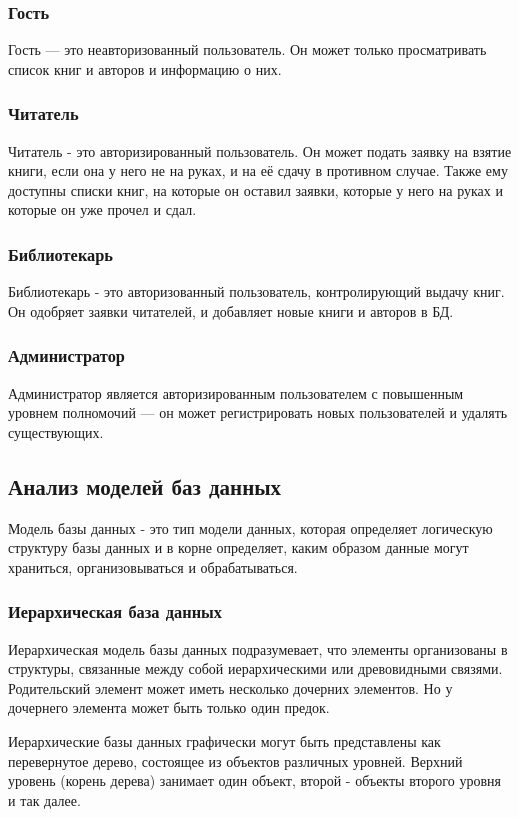 \subsubsection{Гость}
Гость — это неавторизованный пользователь. Он может только просматривать список книг и авторов и информацию о них.
\subsubsection{Читатель}
Читатель - это авторизированный пользователь. Он может подать заявку на взятие книги, если она у него не на руках, и на её сдачу в противном случае. Также ему доступны списки книг, на которые он оставил заявки, которые у него на руках и которые он уже прочел и сдал.
\subsubsection{Библиотекарь} 
Библиотекарь - это авторизованный пользователь, контролирующий выдачу книг. Он одобряет заявки читателей, и добавляет новые книги и авторов в БД.
\subsubsection{Администратор}
Администратор является авторизированным пользователем с повышенным уровнем полномочий — он может регистрировать новых пользователей и удалять существующих.
\subsection{Анализ моделей баз данных}
Модель базы данных - это тип модели данных, которая определяет логическую структуру базы данных и в корне определяет, каким образом данные могут храниться, организовываться и обрабатываться.

\subsubsection{Иерархическая база данных}
Иерархическая модель базы данных подразумевает, что элементы организованы в структуры, связанные между собой иерархическими или древовидными связями. Родительский элемент может иметь несколько дочерних элементов. Но у дочернего элемента может быть только один предок.

Иерархические базы данных графически могут быть представлены как перевернутое дерево, состоящее из объектов различных уровней. Верхний уровень (корень дерева) занимает один объект, второй - объекты второго уровня и так далее. 

